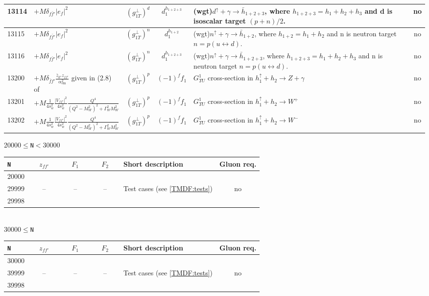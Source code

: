 \documentclass[prd,nofootinbib,eqsecnum,final]{revtex4}
\newcommand{\Ds}{\displaystyle}
\renewcommand{\(}{\left(}
\renewcommand{\)}{\right)}
\renewcommand{\[}{\left[}
\renewcommand{\]}{\right]}
\begin{document}
\begin{center}
\begin{longtable}{||l|p{6cm}|c|c||p{7cm}|c||}
\\\hline
13114 & $+M\delta_{f\bar f'}|e_f|^2$~~&$(g_{1T}^\perp)^{d}$ & $d^{h_{1+2+3}}_1$ & (wgt)$d^{\uparrow}+\gamma\to \bar h_{1+2+3}$, where $h_{1+2+3}=h_1+h_2+h_3$ and d is isoscalar target $(p+n)/2$. & no
\\\hline
13115 & $+M\delta_{f\bar f'}|e_f|^2$~~&$(g_{1T}^\perp)^{n}$ & $d^{h_{1+2}}_1$ & (wgt)$n^{\uparrow}+\gamma\to \bar h_{1+2}$, where $h_{1+2}=h_1+h_2$ and n is neutron target $n=p(u\leftrightarrow d)$. & no
\\\hline
13116 & $+M\delta_{f\bar f'}|e_f|^2$~~&$(g_{1T}^\perp)^{n}$ & $d^{h_{1+2+3}}_1$ & (wgt)$n^{\uparrow}+\gamma\to \bar h_{1+2+3}$, where $h_{1+2+3}=h_1+h_2+h_3$ and n is neutron target $n=p(u\leftrightarrow d)$. & no
\\\hline
13200 & $+M\Ds\delta_{\bar f f'}\frac{\bar z_{ll'}z_{ff'}}{\alpha_{\text{em}}^2}$ given in (2.8) of \cite{Scimemi:2017etj} & $(g_{1T}^\perp)^p$ & $(-1)^f f_1$ & $G_{TU}^1$ cross-section in $h_1^{\uparrow}+h_2\to Z+\gamma$ & no
\\\hline
13201 & $+M\Ds \frac{1}{4s_w^2}\frac{|V_{f f'}|^2}{4s_w^2}\frac{Q^4}{(Q^2-M_W^2)^2+\Gamma_W^2M_W^2}$ & $(g_{1T}^\perp)^p$ & $(-1)^ff_1$ & $G_{TU}^1$ cross-section in $h_1^{\uparrow}+h_2\to W^+$ & no
\\\hline
13202 & $+M\Ds \frac{1}{4s_w^2}\frac{|V_{f f'}|^2}{4s_w^2}\frac{Q^4}{(Q^2-M_W^2)^2+\Gamma_W^2M_W^2}$ & $(g_{1T}^\perp)^p$ & $(-1)^ff_1$ & $G_{TU}^1$ cross-section in $h_1^{\uparrow}+h_2\to W^-$ & no
\\\hline\hline
\end{longtable}

20000$\leqslant$\texttt{N}$<$30000
\\
\begin{tabular}{||l|c|c|c||p{8cm}|c||}
\hline\hline
\texttt{N} & ~~$z_{ff'}$~~& ~~$F_1$~~ & ~~$F_2$~~&  Short description & Gluon req. 
\\\hline
20000 &  &  &  &  & 
\\
29999 & -- & -- & -- & Test cases (see \ref{TMDF:tests}) & no
\\
29998 &  &  &  &  & 
\\\hline\hline
\end{tabular}
\\
30000$\leqslant$\texttt{N}
\\
\begin{tabular}{||l|c|c|c||p{8cm}|c||}
\hline\hline
\texttt{N} & ~~$z_{ff'}$~~& ~~$F_1$~~ & ~~$F_2$~~&  Short description & Gluon req. 
\\\hline
30000 &  &  &  &  & 
\\
39999 & -- & -- & -- & Test cases (see \ref{TMDF:tests}) & no
\\
39998 &  &  &  &  & 
\\\hline\hline
\end{tabular}
\end{center}
\end{document}
